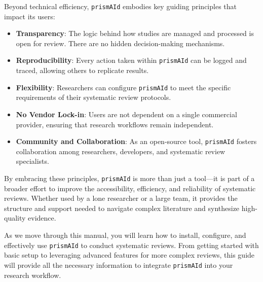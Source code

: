 Beyond technical efficiency, \texttt{prismAId} embodies key guiding principles that impact its users:

\begin{itemize}
    \item \textbf{Transparency}: The logic behind how studies are managed and processed is open for review. There are no hidden decision-making mechanisms.
    \item \textbf{Reproducibility}: Every action taken within \texttt{prismAId} can be logged and traced, allowing others to replicate results.
    \item \textbf{Flexibility}: Researchers can configure \texttt{prismAId} to meet the specific requirements of their systematic review protocols.
    \item \textbf{No Vendor Lock-in}: Users are not dependent on a single commercial provider, ensuring that research workflows remain independent.
    \item \textbf{Community and Collaboration}: As an open-source tool, \texttt{prismAId} fosters collaboration among researchers, developers, and systematic review specialists.
\end{itemize}


By embracing these principles, \texttt{prismAId} is more than just a tool—it is part of a broader effort to improve the accessibility, efficiency, and reliability of systematic reviews. Whether used by a lone researcher or a large team, it provides the structure and support needed to navigate complex literature and synthesize high-quality evidence.

As we move through this manual, you will learn how to install, configure, and effectively use \texttt{prismAId} to conduct systematic reviews. From getting started with basic setup to leveraging advanced features for more complex reviews, this guide will provide all the necessary information to integrate \texttt{prismAId} into your research workflow.


